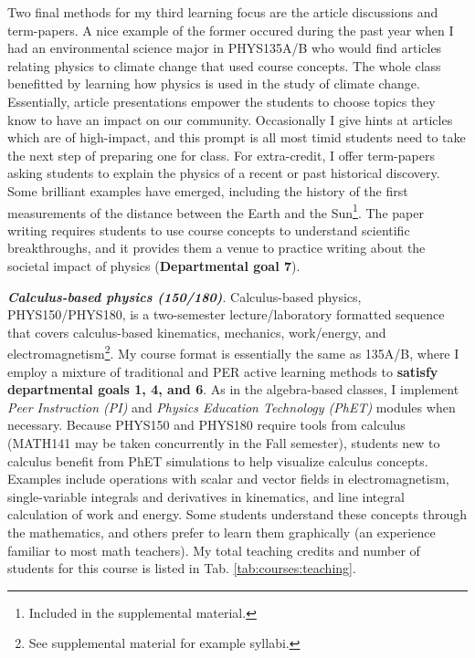 \documentclass[../../../main.tex]{subfiles}
\begin{document}
Two final methods for my third learning focus are the article discussions and term-papers.  A nice example of the former occured during the past year when I had an environmental science major in PHYS135A/B who would find articles relating physics to climate change that used course concepts.  The whole class benefitted by learning how physics is used in the study of climate change.  Essentially, article presentations empower the students to choose topics they know to have an impact on our community.  Occasionally I give hints at articles which are of high-impact, and this prompt is all most timid students need to take the next step of preparing one for class.  For extra-credit, I offer term-papers asking students to explain the physics of a recent or past historical discovery.  Some brilliant examples have emerged, including the history of the first measurements of the distance between the Earth and the Sun\footnote{Included in the supplemental material.}.  The paper writing requires students to use course concepts to understand scientific breakthroughs, and it provides them a venue to practice writing about the societal impact of physics (\textbf{Departmental goal 7}).  \\ \hspace{0.1cm}

\textbf{\textit{Calculus-based physics (150/180)}}. Calculus-based physics, PHYS150/PHYS180, is a two-semester lecture/laboratory formatted sequence that covers calculus-based kinematics, mechanics, work/energy, and electromagnetism\footnote{See supplemental material for example syllabi.}.  My course format is essentially the same as 135A/B, where I employ a mixture of traditional and PER active learning methods to \textbf{satisfy departmental goals 1, 4, and 6}.  As in the algebra-based classes, I implement \textit{Peer Instruction (PI)} \cite{mazur2013peer} and \textit{Physics Education Technology (PhET)} \cite{phet} modules when necessary.  Because PHYS150 and PHYS180 require tools from calculus (MATH141 may be taken concurrently in the Fall semester), students new to calculus benefit from PhET simulations to help visualize calculus concepts.  Examples include operations with scalar and vector fields in electromagnetism, single-variable integrals and derivatives in kinematics, and line integral calculation of work and energy.  Some students understand these concepts through the mathematics, and others prefer to learn them graphically (an experience familiar to most math teachers).  My total teaching credits and number of students for this course is listed in Tab. \ref{tab:courses:teaching}. \\ \hspace{0.1cm}
\end{document}
